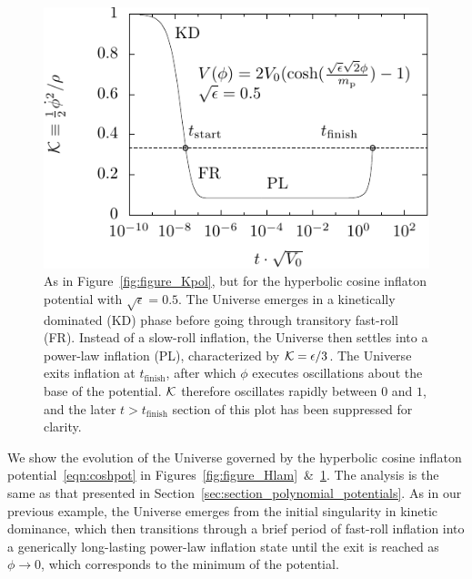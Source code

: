%
\begin{figure}[tp]
  \includegraphics[width=\textwidth]{chapters/kinetic_dominance/figures/Klam}
  \caption{As in Figure~\protect\ref{fig:figure_Kpol}, but for the hyperbolic cosine inflaton potential with $\sqrt{\epsilon}=0.5$. The Universe emerges in a kinetically dominated (KD) phase before going through transitory fast-roll (FR). Instead of a slow-roll inflation, the Universe then settles into a power-law inflation (PL), characterized by $\mathcal{K}=\epsilon/3$. The Universe exits inflation at $t_\mathrm{finish}$, after which $\phi$ executes oscillations about the base of the potential. $\mathcal{K}$ therefore oscillates rapidly between $0$ and $1$, and the later $t>t_\mathrm{finish}$ section of this plot has been suppressed for clarity.\label{fig:figure_Klam}}
\end{figure}
%

We show the evolution of the Universe governed by the hyperbolic cosine inflaton potential~\eqref{eqn:coshpot} in Figures~\ref{fig:figure_Hlam}~\&~\ref{fig:figure_Klam}. The analysis is the same as that presented in Section~\ref{sec:section_polynomial_potentials}.  As in our previous example, the Universe emerges from the initial singularity in kinetic dominance, which then transitions through a brief period of fast-roll inflation into a generically long-lasting power-law inflation state until the exit is reached as $\phi\rightarrow0$, which corresponds to the minimum of the potential.  

